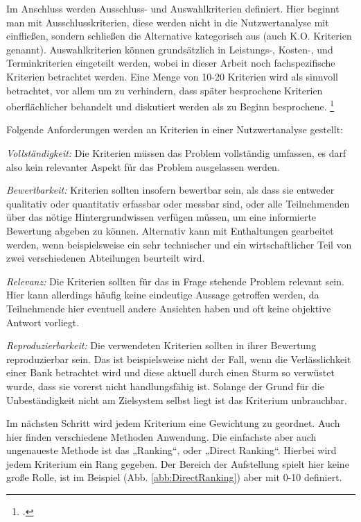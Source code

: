 Im Anschluss werden Ausschluss- und Auswahlkriterien definiert. Hier beginnt man mit Ausschlusskriterien, diese werden nicht in die Nutzwertanalyse mit einfließen, sondern schließen die Alternative kategorisch aus (auch K.O. Kriterien genannt). Auswahlkriterien können grundsätzlich in Leistungs-, Kosten-, und Terminkriterien eingeteilt werden, wobei in dieser Arbeit noch fachspezifische Kriterien betrachtet werden. \footnotemark
{}
Eine Menge von 10-20 Kriterien wird als sinnvoll betrachtet, vor allem um zu verhindern, dass später besprochene Kriterien oberflächlicher behandelt und diskutiert werden als zu Beginn besprochene. \footcite[Vgl.][S. 8]{Kuhnapfel.2019}

Folgende Anforderungen werden an Kriterien in einer Nutzwertanalyse gestellt: \footnotemark
{}

\begin{description}
	\item \emph{Vollständigkeit:} Die Kriterien müssen das Problem vollständig umfassen, es darf also kein relevanter Aspekt für das Problem ausgelassen werden.
	\item \emph{Bewertbarkeit:} Kriterien sollten insofern bewertbar sein, als dass sie entweder qualitativ oder quantitativ erfassbar oder messbar sind, oder alle Teilnehmenden über das nötige Hintergrundwissen verfügen müssen, um eine informierte Bewertung abgeben zu können. Alternativ kann mit Enthaltungen gearbeitet werden, wenn beispielsweise ein sehr technischer und ein wirtschaftlicher Teil von zwei verschiedenen Abteilungen beurteilt wird.
	\item \emph{Relevanz:} Die Kriterien sollten für das in Frage stehende Problem relevant sein. Hier kann allerdings häufig keine eindeutige Aussage getroffen werden, da Teilnehmende hier eventuell andere Ansichten haben und oft keine objektive Antwort vorliegt.
	\item \emph{Reproduzierbarkeit:} Die verwendeten Kriterien sollten in ihrer Bewertung reproduzierbar sein. Das ist beispielsweise nicht der Fall, wenn die Verlässlichkeit einer Bank betrachtet wird und diese aktuell durch einen Sturm so verwüstet wurde, dass sie vorerst nicht handlungsfähig ist. Solange der Grund für die Unbeständigkeit nicht am Zielsystem selbst liegt ist das Kriterium unbrauchbar.
\end{description}

Im nächsten Schritt wird jedem Kriterium eine Gewichtung zu geordnet. Auch hier finden verschiedene Methoden Anwendung. Die einfachste aber auch ungenaueste Methode ist das „Ranking“, oder „Direct Ranking“. Hierbei wird jedem Kriterium ein Rang gegeben. Der Bereich der Aufstellung spielt hier keine große Rolle, ist im Beispiel (Abb. \ref{abb:DirectRanking}) aber mit 0-10 definiert.

